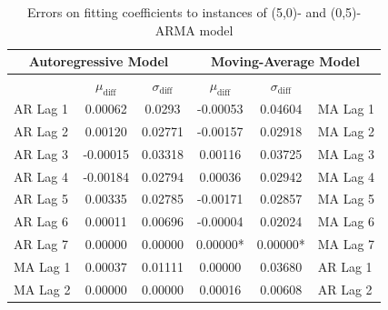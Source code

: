 \documentclass[oneside,12pt,openany]{book}
\begin{document}
\begin{table}[hbt!]
    \centering
    \begin{tabular}{|l|c|c|c|c|l|}
        \hline
        \multicolumn{3}{|c|}{Autoregressive Model} & \multicolumn{3}{c|}{Moving-Average Model} \\ \hline
        \cellcolor{black} & $\mu_{\text{diff}}$ & $\sigma_{\text{diff}}$ & $\mu_{\text{diff}}$ & $\sigma_{\text{diff}}$ &  \cellcolor{black} \\ \hline
        AR Lag 1 & 0.00062 & 0.0293 & -0.00053 & 0.04604 & MA Lag 1 \\ \hline
        AR Lag 2 & 0.00120 & 0.02771 & -0.00157 & 0.02918 & MA Lag 2 \\ \hline
        AR Lag 3 & -0.00015 & 0.03318 & 0.00116 & 0.03725 & MA Lag 3 \\ \hline
        AR Lag 4 & -0.00184 & 0.02794 & 0.00036 & 0.02942 & MA Lag 4 \\ \hline
        AR Lag 5 & 0.00335 & 0.02785 & -0.00171 & 0.02857 & MA Lag 5 \\ \hline
        AR Lag 6 & 0.00011 & 0.00696 & -0.00004 & 0.02024 & MA Lag 6 \\ \hline
        AR Lag 7 & 0.00000 & 0.00000 & 0.00000* & 0.00000* & MA Lag 7 \\ \hline
        MA Lag 1 & 0.00037 & 0.01111 & 0.00000 & 0.03680 & AR Lag 1 \\ \hline
        MA Lag 2 & 0.00000 & 0.00000 & 0.00016 & 0.00608 & AR Lag 2 \\ \hline
    \end{tabular}
    \caption{Errors on fitting coefficients to instances of (5,0)- and (0,5)-ARMA model}
    \label{tab:errortsfitting5}
\end{table}
	
\end{document}
